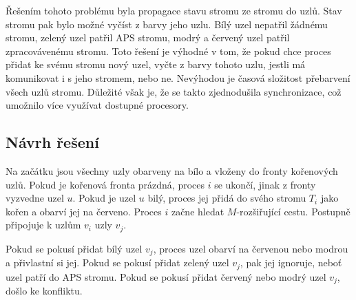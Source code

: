 \documentclass[a4paper, 11pt, titlepage, final]{article}[3. prosinec 2011]
\begin{document}
Řešením tohoto problému byla propagace stavu stromu ze stromu do uzlů. Stav stromu pak bylo možné vyčíst z barvy jeho uzlu. Bílý uzel nepatřil žádnému stromu, zelený uzel patřil APS stromu, modrý a červený uzel patřil zpracovávenému stromu. Toto řešení je výhodné v tom, že pokud chce proces přidat ke svému stromu nový uzel, vyčte z barvy tohoto uzlu, jestli má komunikovat i s jeho stromem, nebo ne. Nevýhodou je časová složitost přebarvení všech uzlů stromu. Důležité však je, že se takto zjednodušila synchronizace, což umožnilo více využívat dostupné procesory.

\subsection{Návrh řešení}

Na začátku jsou všechny uzly obarveny na bílo a vloženy do fronty kořenových uzlů. Pokud je kořenová fronta prázdná, proces $i$ se ukončí, jinak z fronty vyzvedne uzel $u$. Pokud je uzel $u$ bilý, proces jej přidá do svého stromu $T_i$ jako kořen a obarví jej na červeno. Proces $i$ začne hledat $M$-rozšiřující cestu. Postupně připojuje k uzlům $v_i$ uzly $v_j$. 

Pokud se pokusí přidat bílý uzel $v_j$, proces uzel obarví na červenou nebo modrou a přivlastní si jej. Pokud se pokusí přidat zelený uzel $v_j$, pak jej ignoruje, neboť uzel patří do APS stromu. Pokud se pokusí přidat červený nebo modrý uzel $v_j$, došlo ke konfliktu. 
\end{document}
